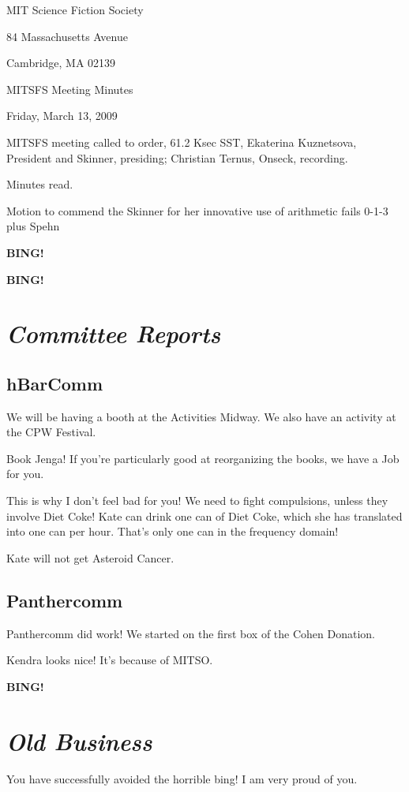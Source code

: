 \documentclass[10pt]{article}
\newcommand{\bing}{{\bf BING!} }
\newcommand{\goto}[1]{\bing \vskip 12pt \section*{{\em{#1}}}}
\newcommand{\ps}{ plus Spehn\xspace}
\begin{document}
\begin{center}

MIT Science Fiction Society

84 Massachusetts Avenue

Cambridge, MA 02139

\vspace{12pt}

MITSFS Meeting Minutes

Friday, March 13, 2009

\end{center}

\vspace{18pt}

\setlength{\parskip}{6pt}

\noindent
MITSFS meeting called to order, 61.2 Ksec SST,
Ekaterina Kuznetsova, President and Skinner, presiding; Christian Ternus, Onseck, recording.

Minutes read.

Motion to commend the Skinner for her innovative use of arithmetic fails 0-1-3 \ps

\bing

\goto{Committee Reports}

\subsection*{hBarComm}

We will be having a booth at the Activities Midway.  We also have an
activity at the CPW Festival.

Book Jenga!  If you're particularly good at reorganizing the books, we
have a Job for you.


This is why I don't feel bad for you!  We need to fight compulsions,
unless they involve Diet Coke!  Kate can drink one can of Diet Coke,
which she has translated into one can per hour.  That's only one can
in the frequency domain!  

Kate will not get Asteroid Cancer.

\subsection*{Panthercomm}

Panthercomm did work!  We started on the first box of the Cohen
Donation.

Kendra looks nice!  It's because of MITSO.

\goto{Old Business}

You have successfully avoided the horrible bing!  I am very proud of
you.
\end{document}
